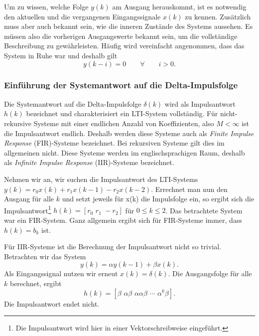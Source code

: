 
Um zu wissen, welche Folge $y(k)$ am Ausgang herauskommt, ist es
notwendig den aktuellen und die vergangenen Eingangssignale $x(k)$
zu kennen. Zusätzlich muss aber auch bekannt sein, wie die inneren
Zustände des Systems aussehen. Es müssen also die vorherigen
Ausgangswerte bekannt sein, um die vollständige Beschreibung zu
gewährleisten. Häufig wird vereinfacht angenommen, dass das System
in Ruhe war und deshalb gilt
\[
   y(k-i) = 0 \qquad \forall \qquad i>0.
\]

\subsubsection{Einführung der Systemantwort auf die Delta-Impulsfolge}
Die Systemantwort auf die Delta-Impulsfolge $\delta(k)$ wird als
Impulsantwort $h(k)$ bezeichnet und charakterisiert ein LTI-System
vollständig. Für nicht-rekursive Systeme mit einer endlichen
Anzahl von Koeffizienten, also $M< \infty$ ist die Impulsantwort
endlich. Deshalb werden diese Systeme auch als {\em Finite Impulse
Response} (FIR)-Systeme bezeichnet. Bei rekursiven Systeme gilt
dies im allgemeinen nicht. Diese Systeme werden im
englischsprachigen Raum, deshalb als {\em Infinite Impulse
Response} (IIR)-Systeme bezeichnet.

\begin{example}

Nehmen wir an, wir suchen die Impulsantwort des LTI-Systems $y(k)
= r_0 x(k) + r_1 x(k-1) - r_2 x(k-2)$. Errechnet man nun den
Ausgang für alle $k$ und setzt jeweils für x(k) die Impulsfolge
ein, so ergibt sich die Impulsantwort\footnote{Die Impulsantwort wird hier
in einer Vektorschreibweise eingeführt.} $h(k) = [r_0 \,\, r_1 \,\,
-r_2]$ für $0 \leq k \leq 2$. Das betrachtete System
war ein FIR-System. Ganz allgemein ergibt sich für FIR-Systeme
immer, dass $h(k) = b_k$ ist.

Für IIR-Systeme ist die Berechnung der Impulsantwort nicht so
trivial. Betrachten wir das System
\[
y(k) = \alpha y(k-1) + \beta x(k).
\]
Als Eingangssignal nutzen wir erneut $x(k)= \delta(k)$.
Die Ausgangsfolge für
alle $k$ berechnet, ergibt
\[h(k) = [\beta \,\, \alpha \beta \,\,
\alpha \alpha \beta \,\, \cdots \,\, \alpha^{k}\beta].
\]
Die Impulsantwort endet nicht.
\end{example}

